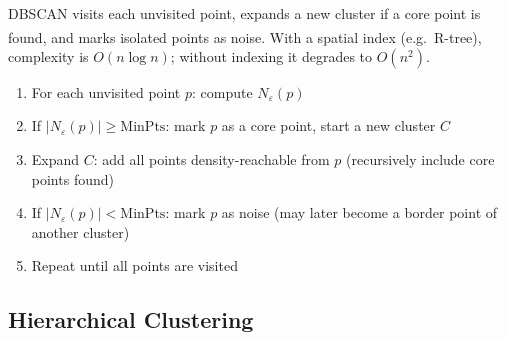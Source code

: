 \begin{tcbitemize}[ skin=sectionraster, halign lower=center ]
    \tcbitem[title=DBSCAN Algorithm, raster multicolumn=6]
    DBSCAN visits each unvisited point, expands a new cluster if a core point is found, and marks isolated points as noise\textsuperscript{\cite[][pp.~474--477]{hanDataMiningConcepts2012}}. With a spatial index (e.g.\ R-tree), complexity is $O(n \log n)$; without indexing it degrades to $O(n^2)$.
    \tcblower
    \begin{enumerate}
        \item For each unvisited point $p$: compute $N_\varepsilon(p)$
        \item If $|N_\varepsilon(p)| \geq \text{MinPts}$: mark $p$ as a core point, start a new cluster $C$
        \item Expand $C$: add all points density-reachable from $p$ (recursively include core points found)
        \item If $|N_\varepsilon(p)| < \text{MinPts}$: mark $p$ as noise (may later become a border point of another cluster)
        \item Repeat until all points are visited
    \end{enumerate}
\end{tcbitemize}

\subsection{Hierarchical Clustering}


